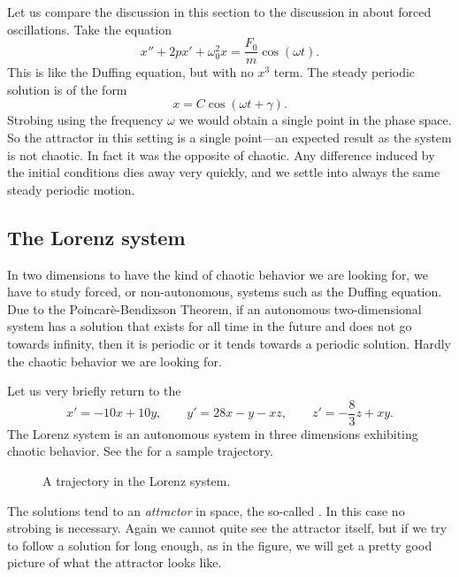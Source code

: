 \documentclass[12pt]{book}
\begin{document}
Let us
compare the discussion in this section to the discussion in  about forced
oscillations.  Take the equation
\begin{equation*}
x''+2p x' + \omega_0^2 x = \frac{F_0}{m} \cos (\omega t) .
\end{equation*}
This is like the Duffing equation, but with no $x^3$ term.
The steady periodic solution is of the form
\begin{equation*}
x = C \cos (\omega t + \gamma) .
\end{equation*}
Strobing using the frequency $\omega$ we would obtain a single point in the
phase space.  So the attractor in this setting is a single point---an
expected result as the system is not chaotic.  In fact it was the opposite
of chaotic.  Any difference induced by the initial conditions dies away very
quickly, and we settle into always the same steady periodic motion.

\subsection{The Lorenz system}

In two dimensions to have the kind of chaotic behavior we are looking for,
we have to study forced, or non-autonomous, systems such as the Duffing
equation.
Due to the Poincar\`e-Bendixson Theorem, if an autonomous
two-dimensional system has a solution that exists for all time in the future
and does not go towards infinity,
then it is periodic or it tends towards a periodic solution.  Hardly the chaotic
behavior we are looking for.

Let us very briefly return to the 
\begin{equation*}
x' = -10x +10y, \qquad y' = 28x-y-xz, \qquad z'=-\frac{8}{3}z + xy .
\end{equation*}
The Lorenz system is an autonomous system in three dimensions
exhibiting chaotic behavior.
See the  for a sample trajectory.
\begin{figure}[h!t]
\capstart
\begin{center}
\caption{A trajectory in the Lorenz system. \label{nlin:lorenz}}
\end{center}
\end{figure}

The solutions tend to an \emph{attractor} in space,
the so-called \emph{}.  In this case no strobing is
necessary.
Again we cannot quite see the attractor itself, but if we try to follow a solution
for long enough, as in the figure,
we will get a pretty good picture of what the attractor looks
like.
\end{document}
